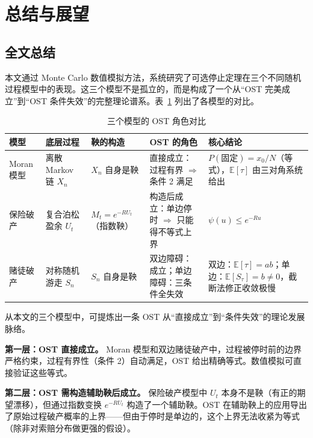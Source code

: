 \section{总结与展望}

\subsection{全文总结}

本文通过 Monte Carlo 数值模拟方法，系统研究了可选停止定理在三个不同随机过程模型中的表现。这三个模型不是孤立的，而是构成了一个从``OST 完美成立''到``OST 条件失效''的完整理论谱系。表~\ref{tab:summary} 列出了各模型的对比。

\begin{table}[ht]
  \centering
  \caption{三个模型的 OST 角色对比}
  \label{tab:summary}
  \begin{tabular}{lp{2.5cm}p{2.5cm}p{2.5cm}p{3.2cm}}
    \toprule
    模型 & 底层过程 & 鞅的构造 & OST 的角色 & 核心结论 \\
    \midrule
    Moran 模型 & 离散 Markov 链 $X_n$ &
    $X_n$ 自身是鞅 &
    直接成立：过程有界 $\Rightarrow$ 条件 2 满足 &
    $P(\text{固定}) = x_0/N$（等式），$\mathbb{E}[\tau]$ 由三对角系统给出 \\
    \addlinespace
    保险破产 & 复合泊松盈余 $U_t$ &
    $M_t = e^{-R U_t}$（指数鞅）&
    构造后成立：单边停时 $\Rightarrow$ 只能得不等式上界 &
    $\psi(u) \leqslant e^{-R u}$ \\
    \addlinespace
    赌徒破产 & 对称随机游走 $S_n$ &
    $S_n$ 自身是鞅 &
    双边障碍：成立；单边障碍：三条件全失效 &
    双边：$\mathbb{E}[\tau] = ab$；单边：$\mathbb{E}[S_\tau] = b \neq 0$，截断法修正收敛极慢 \\
    \bottomrule
  \end{tabular}
\end{table}

从本文的三个模型中，可提炼出一条 OST 从``直接成立''到``条件失效''的理论发展脉络。

\textbf{第一层：OST 直接成立。} Moran 模型和双边赌徒破产中，过程被停时前的边界严格约束，过程有界性（条件 2）自动满足，OST 给出精确等式。数值模拟可直接验证这些等式。

\textbf{第二层：OST 需构造辅助鞅后成立。} 保险破产模型中 $U_t$ 本身不是鞅（有正的期望漂移），但通过指数变换 $e^{-R U_t}$ 构造了一个辅助鞅。OST 在辅助鞅上的应用导出了原始过程破产概率的上界——但由于停时是单边的，这个上界无法收紧为等式（除非对索赔分布做更强的假设）。

